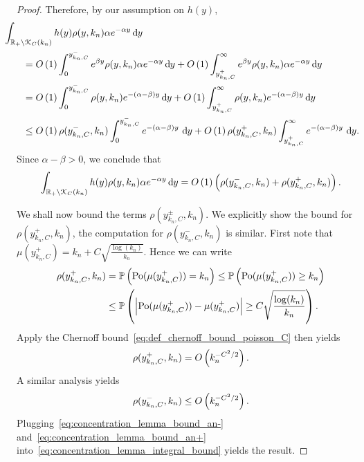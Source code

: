 \begin{appendices}
\begin{proof}
Therefore, by our assumption on $h(y)$,
\begin{align*}
	&\hspace{-20pt}\int_{\R_+ \setminus \Kcal_C(k_n)} h(y) \rho(y,k_n) 
		\alpha e^{-\alpha y} \dd y\\
    &= \bigO{1} \int_0^{y_{k_n,C}^-} e^{\beta y} \rho(y,k_n) \alpha e^{-\alpha y} \dd y 
    	+ \bigO{1}\int_{y_{k_n,C}^+}^{\infty} e^{\beta y} \rho(y,k_n) \alpha e^{-\alpha y} \dd y \\
    &= \bigO{1} \int_0^{y_{k_n,C}^-} \rho(y,k_n) e^{-(\alpha-\beta) y} \dd y 
   		+ \bigO{1} \int_{y_{k_n,C}^+}^{\infty} \rho(y,k_n) e^{-(\alpha-\beta) y} \dd y\\
   	&\le \bigO{1}\rho(y_{k_n,C}^-,k_n)\int_0^{y_{k_n,C}^-} e^{-(\alpha-\beta) y} \, \dd y
   		+ \bigO{1} \rho(y_{k_n,C}^+,k_n) \int_{y_{k_n,C}^+}^{\infty} e^{-(\alpha-\beta) y} \, \dd y.
\end{align*}
Since $\alpha - \beta > 0$, we conclude that
\begin{equation}\label{eq:concentration_lemma_integral_bound}
	\int_{{\mathbb R}_+ \setminus {\mathcal K}_C(k_n)} h(y) \rho(y,k_n) \alpha e^{-\alpha y} \operatorname{\mathrm{d}\hspace{-2pt}} y
	= O\left(1\right) \left(\rho(y_{k_n,C}^-,k_n) + \rho(y_{k_n,C}^+,k_n)\right).
\end{equation}

We shall now bound the terms $\rho(y_{k_n,C}^\pm,k_n)$. We explicitly show the bound for $\rho(y_{k_n,C}^+,k_n)$, the computation for $\rho(y_{k_n,C}^-,k_n)$ is similar. First note that $\mu(y_{k_n,C}^+) = k_n + C \sqrt{\frac{\log(k_n)}{k_n}}$. Hence we can write
\begin{align*}
	\rho(y_{k_n,C}^+,k_n) &= \mathbb{P}\left({\mathrm{Po}}(\mu(y_{k_n,C}^+)) = k_n\right) \le \mathbb{P}\left({\mathrm{Po}}(\mu(y_{k_n,C}^+)) \ge k_n\right)\\
	&\le \mathbb{P}\left(\left|{\mathrm{Po}}(\mu(y_{k_n,C}^+)) - \mu(y_{k_n,C}^+)\right| \ge C \sqrt{\frac{\log(k_n)}{k_n}}\right).
\end{align*}
Apply the Chernoff bound~\eqref{eq:def_chernoff_bound_poisson_C} then yields
\begin{equation}\label{eq:concentration_lemma_bound_an+}
	\rho(y_{k_n,C}^+,k_n) = O\left(k_n^{-C^2/2}\right).
\end{equation}
A similar analysis yields
\begin{equation}\label{eq:concentration_lemma_bound_an-}
	\rho(y_{k_n,C}^-,k_n) \le O\left(k_n^{-C^2/2}\right).
\end{equation} 
Plugging~\eqref{eq:concentration_lemma_bound_an-} and~\eqref{eq:concentration_lemma_bound_an+}  into~\eqref{eq:concentration_lemma_integral_bound} yields the result. 



\end{proof}
\end{appendices}
